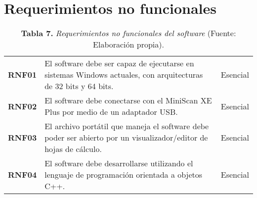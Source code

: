 \section{Requerimientos no funcionales}
\FloatBarrier
	\begin{table}[htb]
		\small
		\caption{\textbf{Tabla 7.} \textit{Requerimientos no funcionales del software} (Fuente: Elaboraci\'{o}n propia).}
		\centering
		\setlength{\extrarowheight}{5pt}
		\begin{tabulary}{\anchotabla}{|c|L|c|}
			\hline
			 &  & \\ \hline
			\textbf{RNF01} & El software debe ser capaz de ejecutarse en sistemas Windows actuales, con arquitecturas de 32 bits y 64 bits. & Esencial\\ \hline
			\textbf{RNF02} & El software debe conectarse con el MiniScan XE Plus por medio de un adaptador USB. & Esencial\\ \hline
			\textbf{RNF03} & El archivo port\'{a}til que maneja el software debe poder ser abierto por un visualizador/editor de hojas de c\'{a}lculo. & Esencial\\ \hline
			\textbf{RNF04} & El software debe desarrollarse utilizando el lenguaje de programaci\'{o}n orientada a objetos C++. & Esencial\\ \hline
		\end{tabulary}
	\end{table}
\FloatBarrier %